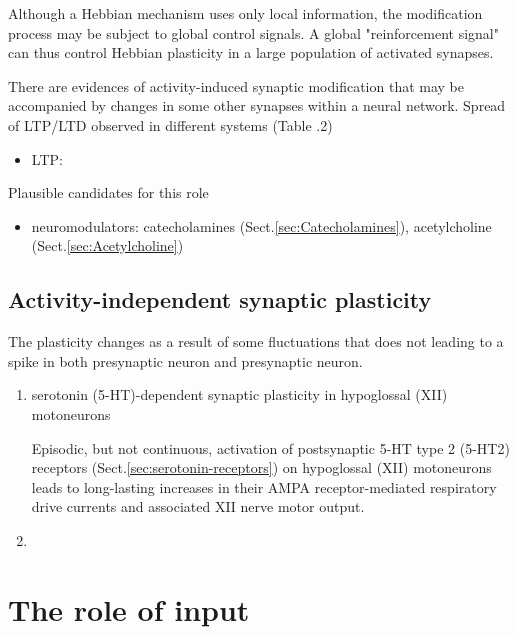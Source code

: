 Although a Hebbian mechanism uses only local information, the modification
process may be subject to global control signals.
A global "reinforcement signal" can thus control Hebbian plasticity in a large
population of activated synapses.

There are evidences of activity-induced synaptic modification  that may  be 
accompanied  by  changes  in  some  other  synapses  within  a  neural network.
Spread of LTP/LTD observed in different systems \citep{bi2001} (Table .2)
\begin{itemize}
  \item LTP: 
\end{itemize}


Plausible candidates for this role
\begin{itemize}
  \item neuromodulators: catecholamines (Sect.\ref{sec:Catecholamines}),
  acetylcholine (Sect.\ref{sec:Acetylcholine})
\end{itemize}


\subsection{Activity-independent synaptic plasticity}
\label{sec:activity-independent-synaptic-plasticity}

The plasticity changes as a result of some fluctuations that does not leading to
a spike in both presynaptic neuron and presynaptic neuron.
\begin{enumerate}
  \item serotonin (5-HT)-dependent synaptic plasticity in hypoglossal (XII)
  motoneurons \citep{bocchiaro2004}
  
  Episodic, but not continuous, activation of postsynaptic 5-HT type 2 (5-HT2)
  receptors (Sect.\ref{sec:serotonin-receptors}) on hypoglossal (XII)
  motoneurons leads to long-lasting increases in their AMPA receptor-mediated
  respiratory drive currents and associated XII nerve motor output.
  
  \item 
\end{enumerate}


\section{The role of input}

